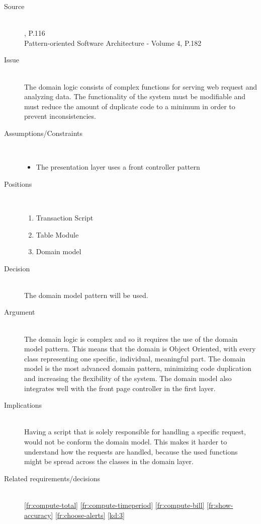 \begin{description}
\item [Source]~\\
\EAA, P.116 \cite{Fowler:2002:PEA:579257}\\
Pattern-oriented Software Architecture - Volume 4, P.182 \cite{wiley-4}

\item [Issue]~\\
The domain logic consists of complex functions for serving web request and analyzing data. The functionality of the system must be modifiable and must reduce the amount of duplicate code to a minimum in order to prevent inconsistencies.

\item [Assumptions/Constraints]~
\begin{itemize}
\item The presentation layer uses a front controller pattern
\end{itemize}

\item [Positions]~
\begin{enumerate}
\item Transaction Script
\item Table Module
\item Domain model
\end{enumerate}

\item [Decision] ~\\
The domain model pattern will be used.

\item [Argument]~\\
The domain logic is complex and so it requires the use of the domain model pattern. This means that the domain is Object Oriented, with every class representing one specific, individual, meaningful part. The domain model is the most advanced domain pattern, minimizing code duplication and increasing the flexibility of the system. The domain model also integrates well with the front page controller in the first layer.

\item [Implications]~\\
Having a script that is solely responsible for handling a specific request, would not be conform the domain model. This makes it harder to understand how the requests are handled, because the used functions might be spread across the classes in the domain layer.

\item [Related requirements/decisions]~\\
\ref{fr:compute-total} \ref{fr:compute-timeperiod} \ref{fr:compute-bill}  \ref{fr:show-accuracy} \ref{fr:choose-alerts} \ref{kd:3}
 
%
\end{description}

